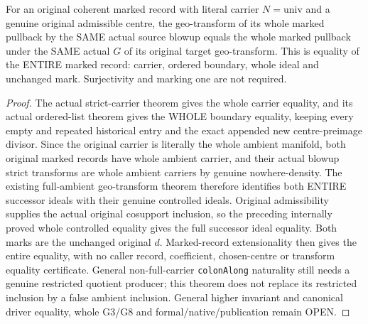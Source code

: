 \begin{theorem}
\label{hir:submersion-controlled-whole-marked-successor}
\leanok
{}
For an original coherent marked record with literal carrier $N=\mathrm{univ}$
and a genuine original admissible centre, the geo-transform of its whole
marked pullback by the SAME actual source blowup equals the whole marked
pullback under the SAME actual $G$ of its original target geo-transform.
This is equality of the ENTIRE marked record: carrier, ordered boundary,
whole ideal and unchanged mark. Surjectivity and marking one are not required.
\end{theorem}
\begin{proof}
The actual strict-carrier theorem gives the whole carrier equality, and
its actual ordered-list theorem gives the WHOLE boundary equality, keeping
every empty and repeated historical entry and the exact appended new
centre-preimage divisor. Since the original carrier is literally the
whole ambient manifold, both original marked records have whole ambient
carrier, and their actual blowup strict transforms are whole ambient
carriers by genuine nowhere-density. The existing full-ambient
geo-transform theorem therefore identifies both ENTIRE successor ideals
with their genuine controlled ideals. Original admissibility supplies the
actual original cosupport inclusion, so the preceding internally proved
whole controlled equality gives the full successor ideal equality.
Both marks are the unchanged original $d$. Marked-record extensionality
then gives the entire equality, with no caller record, coefficient,
chosen-centre or transform equality certificate. General non-full-carrier
\texttt{colonAlong} naturality still needs a genuine restricted quotient
producer; this theorem does not replace its restricted inclusion by a false
ambient inclusion. General higher invariant and canonical driver equality,
whole G3/G8 and formal/native/publication remain OPEN.
\end{proof}
